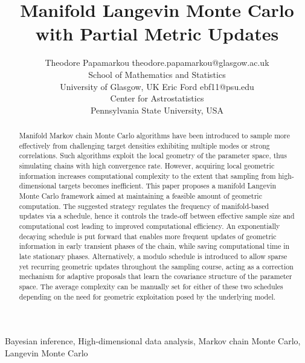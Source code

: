 \documentclass[twoside,11pt]{article}
\begin{document}
\title{Manifold Langevin Monte Carlo with Partial Metric Updates}

\author{\name Theodore Papamarkou
	     \email theodore.papamarkou@glasgow.ac.uk\\
       \addr School of Mathematics and Statistics\\
       University of Glasgow, UK
       \AND
       \name Eric Ford
       \email ebf11@psu.edu\\
       \addr Center for Astrostatistics\\
       Pennsylvania State University, USA
}


\maketitle

\begin{abstract}%
Manifold Markov chain Monte Carlo algorithms have been introduced to sample more effectively from challenging target 
densities exhibiting multiple modes or strong correlations. Such algorithms exploit the local geometry of the parameter 
space, thus simulating chains with high convergence rate. However, acquiring local geometric information increases 
computational complexity to the extent that sampling from high-dimensional targets becomes inefficient.
This paper proposes a manifold Langevin Monte Carlo framework aimed at maintaining a feasible amount of geometric 
computation. The suggested strategy regulates the frequency of manifold-based updates via a schedule, hence it controls the 
trade-off between effective sample size and computational cost leading to improved computational efficiency. An 
exponentially decaying schedule is put forward that enables more frequent updates of geometric information in early 
transient phases of the chain, while saving computational time in late stationary phases. Alternatively, a modulo schedule 
is introduced to allow sparse yet recurring geometric updates throughout the sampling course, acting as a correction 
mechanism for adaptive proposals that learn the covariance structure of the parameter space. The average complexity can be 
manually set for either of these two schedules depending on the need for geometric exploitation posed by the underlying 
model.
\end{abstract}

\begin{keywords}
  Bayesian inference,
  High-dimensional data analysis,
  Markov chain Monte Carlo,
  Langevin Monte Carlo	
\end{keywords}
\end{document}
